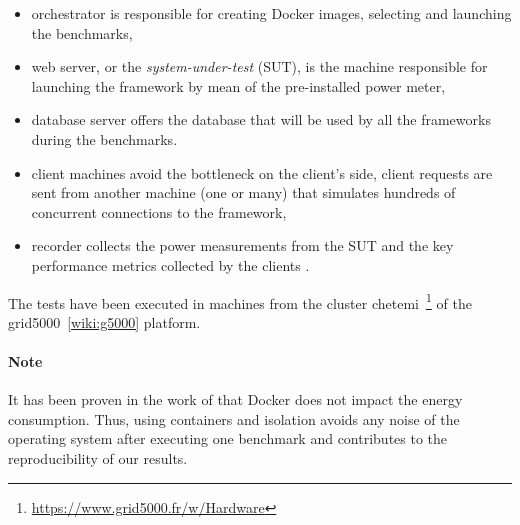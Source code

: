 

\begin{itemize}
    \item \textsf{orchestrator} is responsible for creating Docker images, selecting and launching the benchmarks,
    \item \textsf{web server}, or the \emph{system-under-test} (SUT), is the machine responsible for launching the framework by mean of the pre-installed power meter,
    \item \textsf{database server} offers the database that will be used by all the frameworks during the benchmarks.
    \item \textsf{client machines} avoid the bottleneck on the client's side, client requests are sent from another machine (one or many) that simulates hundreds of concurrent connections to the framework,
    \item \textsf{recorder} collects the power measurements from the SUT and the key performance metrics collected by the clients .
\end{itemize}

The tests have been executed in machines from the cluster \textsf{chetemi}~\footnote{\url{https://www.grid5000.fr/w/Hardware}} of the grid5000~\ref{wiki:g5000} platform.


\paragraph{Note}
It has been proven in the work of \citeauthor{eddie_antonio_santos_how} that Docker does not impact the energy consumption.
Thus, using containers and isolation avoids any noise of the operating system after executing one benchmark and contributes to the reproducibility of our results.

